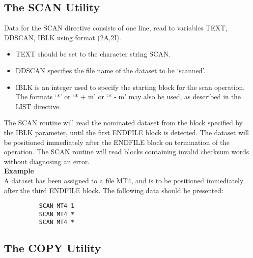 \documentclass[11pt,fleqn]{article}
\begin{document}
\subsection{The SCAN Utility}

Data for the SCAN directive consists of one line, read to variables
TEXT, DDSCAN, IBLK using format (2A,2I).
\begin{itemize}
\item TEXT should be set to the character string SCAN.
\item DDSCAN specifies the file name of the dataset to be
`scanned'.
\item IBLK is an integer used to specify the starting block for the
scan operation. The formats `*' or `* + m' or
`* - m' may also be used, as described in the LIST directive.
\end{itemize}
The SCAN routine will read the nominated dataset from the block
specified by the IBLK parameter, until the first ENDFILE block is
detected. The dataset will be positioned immediately after the ENDFILE
block on termination of the operation. The SCAN routine will read
blocks containing invalid checksum words without diagnosing an error.\\

{\bf Example}\\

A dataset has been assigned to a file MT4, and is to be
positioned immediately after the third ENDFILE block. The following
data should be presented:

{
\footnotesize
\begin{verbatim}
          SCAN MT4 1
          SCAN MT4 *
          SCAN MT4 *
\end{verbatim}
}

\subsection{The COPY Utility}
\end{document}
